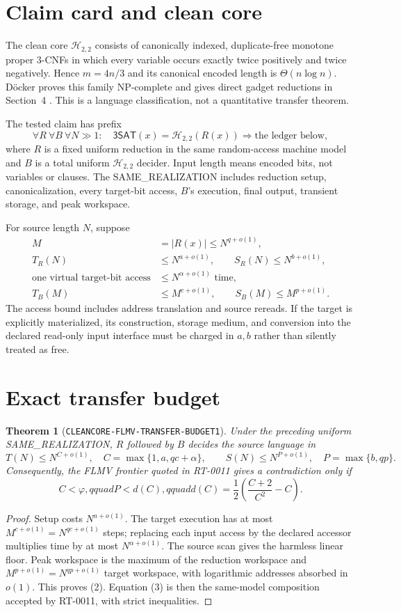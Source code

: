 \documentclass[11pt]{article}
\newtheorem{theorem}{Theorem}
\newcommand{\SAT}{\mathsf{3SAT}}
\newcommand{\Htwo}{\mathcal H_{2,2}}
\begin{document}
\section{Claim card and clean core}
The clean core $\Htwo$ consists of canonically indexed, duplicate-free
monotone proper 3-CNFs in which every variable occurs exactly twice
positively and twice negatively.  Hence $m=4n/3$ and its canonical encoded
length is $\Theta(n\log n)$.  D\"ocker proves this family NP-complete and
gives direct gadget reductions in Section~4 \cite{doecker}.  This is a
language classification, not a quantitative transfer theorem.

The tested claim has prefix
\[
 \forall R\ \forall B\ \forall N\gg1:
 \quad \SAT(x)=\Htwo(R(x))
 \Longrightarrow \text{the ledger below},                         \tag{1}
\]
where $R$ is a fixed uniform reduction in the same random-access machine
model and $B$ is a total uniform $\Htwo$ decider.  Input length means encoded
bits, not variables or clauses.  The SAME\_REALIZATION includes reduction
setup, canonicalization, every target-bit access, $B$'s execution, final
output, transient storage, and peak workspace.

For source length $N$, suppose
\begin{align*}
 M&=|R(x)|\le N^{q+o(1)},\\
 T_R(N)&\le N^{a+o(1)},\qquad S_R(N)\le N^{b+o(1)},\\
 \text{one virtual target-bit access}&\le N^{\alpha+o(1)}\text{ time},\\
 T_B(M)&\le M^{c+o(1)},\qquad S_B(M)\le M^{p+o(1)}.
\end{align*}
The access bound includes address translation and source rereads.  If the
target is explicitly materialized, its construction, storage medium, and
conversion into the declared read-only input interface must be charged in
$a,b$ rather than silently treated as free.

\section{Exact transfer budget}
\begin{theorem}[\texttt{CLEANCORE-FLMV-TRANSFER-BUDGET1}]
Under the preceding uniform SAME\_REALIZATION, $R$ followed by $B$ decides
the source language in
\[
 T(N)\le N^{C+o(1)},\quad C=\max\{1,a,qc+\alpha\},
 \qquad
 S(N)\le N^{P+o(1)},\quad P=\max\{b,qp\}.              \tag{2}
\]
Consequently, the FLMV frontier quoted in RT-0011 gives a contradiction only
if
\[
 C<\varphi,qquad P<d(C),qquad
 d(C)=\frac12\left(\frac{C+2}{C^2}-C\right).           \tag{3}
\]
\end{theorem}
\begin{proof}
Setup costs $N^{a+o(1)}$.  The target execution has at most
$M^{c+o(1)}=N^{qc+o(1)}$ steps; replacing each input access by the declared
accessor multiplies time by at most $N^{\alpha+o(1)}$.  The source scan gives
the harmless linear floor.  Peak workspace is the maximum of the reduction
workspace and $M^{p+o(1)}=N^{qp+o(1)}$ target workspace, with logarithmic
addresses absorbed in $o(1)$.  This proves (2).  Equation (3) is then the
same-model composition accepted by RT-0011, with strict inequalities.
\end{proof}
\end{document}
